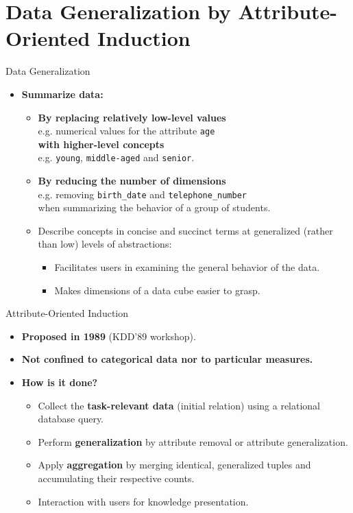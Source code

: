 \section{Data Generalization by Attribute-Oriented Induction}

\begin{frame}{Data Generalization}
  \begin{itemize}
  \item \textbf{Summarize data:}
    \begin{itemize}
    \item \textbf{By replacing relatively low-level values} \\
      e.g. numerical values for the attribute \texttt{age} \\
      \textbf{with higher-level concepts}\\
      e.g. \texttt{young}, \texttt{middle-aged} and \texttt{senior}.
    \item \textbf{By reducing the number of dimensions}\\
      e.g. removing \texttt{birth\_date} and \texttt{telephone\_number} \\ when summarizing the behavior of a group of students.
    \item Describe concepts in concise and succinct terms at generalized (rather than low) levels of abstractions:
      \begin{itemize}
      \item Facilitates users in examining the general behavior of the data.
      \item Makes dimensions of a data cube easier to grasp.
      \end{itemize}
    \end{itemize}
  \end{itemize}
\end{frame}

\begin{frame}{Attribute-Oriented Induction}
  \begin{itemize}
  \item \textbf{Proposed in 1989} (KDD'89 workshop).
  \item \textbf{Not confined to categorical data nor to particular measures.}
  \item \textbf{How is it done?}
    \begin{itemize}
    \item Collect the \textbf{\color{airforceblue}task-relevant data} (initial relation) using a relational database query.
    \item Perform \textbf{\color{airforceblue}generalization} by attribute removal or attribute generalization.
    \item Apply \textbf{\color{airforceblue}aggregation} by merging identical, generalized tuples and \\ accumulating their respective counts.
    \item Interaction with users for knowledge presentation.
    \end{itemize}
  \end{itemize}
\end{frame}

